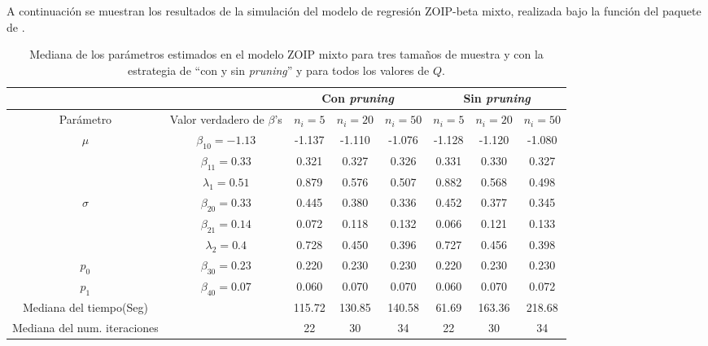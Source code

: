 A continuaci\'{o}n se muestran los resultados de la simulaci\'{o}n del modelo de regresi\'{o}n ZOIP-beta mixto, realizada bajo la funci\'{o}n  del paquete  de .\\

\begin{table}[!hbt]
{\scriptsize
\begin{center}
\begin{tabular}{|c|c|c|c|c|c|c|c|}\hline
& & \multicolumn{3}{|c|}{Con \textit{pruning}} & \multicolumn{3}{|c|}{Sin \textit{pruning}} \\ \hline
Par\'{a}metro & Valor verdadero de $\beta$'s & $n_i=5$ & $n_i=20$ & $n_i=50$ & $n_i=5$ & $n_i=20$ & $n_i=50$ \\ \hline \hline
\multirow{3}{*}{$\mu$} & $\beta_{10}=-1.13$ & -1.137	&-1.110	&-1.076	&-1.128	&-1.120	&-1.080 \\ 
& $\beta_{11}=0.33$ & 0.321	&0.327	&0.326	&0.331	&0.330	&0.327 \\
& $\lambda_1=0.51$ & 0.879	&0.576	&0.507	&0.882	&0.568	&0.498 \\ \hline
\multirow{3}{*}{$\sigma$} & $\beta_{20}=0.33$ & 0.445	&0.380	&0.336	&0.452	&0.377	&0.345 \\ 
& $\beta_{21}=0.14$ & 0.072	&0.118	&0.132	&0.066	&0.121	&0.133\\
& $\lambda_2=0.4$ & 0.728	&0.450	&0.396	&0.727	&0.456	&0.398\\ \hline
$p_0$& $\beta_{30}=0.23$ &0.220	&0.230	&0.230	&0.220	&0.230	&0.230 \\ \hline
$p_1$& $\beta_{40}=0.07$ &0.060	&0.070	&0.070	&0.060	&0.070	&0.072 \\ \hline
Mediana del tiempo(Seg)& &115.72	&130.85	&140.58	&61.69	&163.36	&218.68 \\ \hline
Mediana del num. iteraciones& &22	&30	&34	&22	&30	&34 \\ \hline
\end{tabular}
\caption{Mediana de los par\'{a}metros estimados en el modelo ZOIP mixto para tres tama\~{n}os de muestra y con la estrategia de ``con y sin \textit{pruning}'' y para todos los valores de $Q$.}
\label{T_Sim_mix_ni}
\end{center}
}
\end{table}

